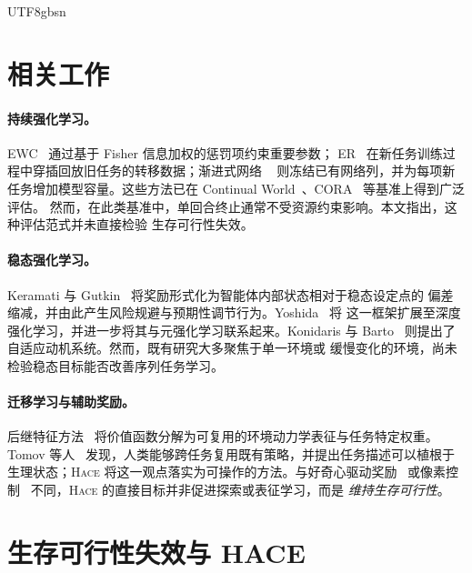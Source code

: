 \documentclass[sigplan,10pt]{acmart}
\newcommand{\hace}{\textsc{Hace}}
\begin{document}
\begin{CJK*}{UTF8}{gbsn}
\section{相关工作}
\label{sec:related}

\paragraph{持续强化学习。}
EWC~\cite{kirkpatrick2017} 通过基于 Fisher 信息加权的惩罚项约束重要参数；
ER~\cite{rolnick2019} 在新任务训练过程中穿插回放旧任务的转移数据；渐进式网络
~\cite{rusu2016} 则冻结已有网络列，并为每项新任务增加模型容量。这些方法已在
Continual World~\cite{continualworld2021}、CORA~\cite{cora2022} 等基准上得到广泛评估。
然而，在此类基准中，单回合终止通常不受资源约束影响。本文指出，这种评估范式并未直接检验
生存可行性失效。

\paragraph{稳态强化学习。}
Keramati 与 Gutkin~\cite{keramati2014} 将奖励形式化为智能体内部状态相对于稳态设定点的
偏差缩减，并由此产生风险规避与预期性调节行为。Yoshida~\cite{yoshida2018,Yoshida} 将
这一框架扩展至深度强化学习，并进一步将其与元强化学习联系起来。Konidaris 与
Barto~\cite{konidaris2006} 则提出了自适应动机系统。然而，既有研究大多聚焦于单一环境或
缓慢变化的环境，尚未检验稳态目标能否改善序列任务学习。

\paragraph{迁移学习与辅助奖励。}
后继特征方法~\cite{Barreto} 将价值函数分解为可复用的环境动力学表征与任务特定权重。
Tomov 等人~\cite{Tomov} 发现，人类能够跨任务复用既有策略，并提出任务描述可以植根于
生理状态；\hace{} 将这一观点落实为可操作的方法。与好奇心驱动奖励~\cite{pathak2017}
或像素控制~\cite{jaderberg2017} 不同，\hace{} 的直接目标并非促进探索或表征学习，而是
\emph{维持生存可行性}。


\section{生存可行性失效与 HACE}
\label{sec:method}


\end{CJK*}
\end{document}
